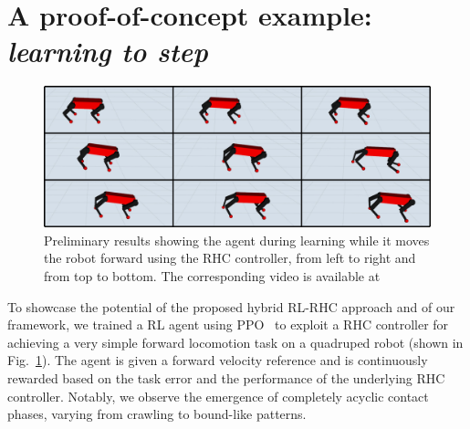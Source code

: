 \section{A proof-of-concept example: \textnormal{\textit{learning to step}}}
\begin{figure}[t]
	\centering
	\includegraphics[width=0.9\columnwidth]{imgs/proof_of_concept.pdf}
	\caption{Preliminary results showing the agent during learning while it moves the robot forward using the RHC controller, from left to right and from top to bottom. The corresponding video is available at~\cite{web::poc_link}}
	\vspace{-0.3cm}
	\label{fig:proof}
\end{figure}
To showcase the potential of the proposed hybrid RL-RHC approach and of our framework, we trained a RL agent using PPO~\cite{rl:schulman2017proximal} to exploit a RHC controller for achieving a very simple forward locomotion task on a quadruped robot (shown in Fig.~\ref{fig:proof}). The agent is given a forward velocity reference and is continuously rewarded based on the task error and the performance of the underlying RHC controller. Notably, we observe the emergence of completely acyclic contact phases, varying from crawling to bound-like patterns.
 